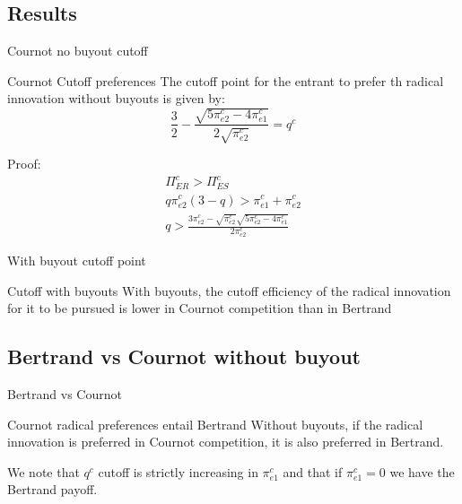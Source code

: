 \documentclass{beamer}
\numberwithin{equation}{section}
\begin{document}
\subsection{Results}
\begin{frame}{Cournot no buyout cutoff}
\begin{block}{Cournot Cutoff preferences}
The cutoff point for the entrant to prefer th radical innovation without buyouts is given by: 
\begin{equation*}
\frac{3}{2}-\frac{ \sqrt{5 \pi_{e2}^{c}-4 \pi_{e1}^{c}}}{2 \sqrt{\pi_{e2}^{c}}}=q^{c}
\end{equation*}
\end{block}
Proof:
\begin{align*}
\Pi_{ER}^{c}>\Pi_{ES}^{c} \\
q \pi_{e2}^{c} (3-q) > \pi_{e1}^{c}+\pi_{e2}^{c} \\
q> 
\frac{3 \pi_{e2}^{c}-\sqrt{\pi_{e2}^{c}} \sqrt{5 \pi_{e2}^{c}-4 \pi_{e1}^{c}}}{2 \pi_{e2}^{c}} 
\end{align*}
\end{frame}

\begin{frame}{With buyout cutoff point}
\begin{block}{Cutoff with buyouts}
With buyouts, the cutoff efficiency of the radical innovation for it to be pursued is lower in Cournot competition than in Bertrand
\end{block}
\end{frame}

\subsection{Bertrand vs Cournot without buyout}
\begin{frame}{Bertrand vs Cournot}
\begin{block}{Cournot radical preferences entail Bertrand}
Without buyouts, if the radical innovation is preferred in Cournot competition, it is also preferred in Bertrand. 
\end{block}
We note that $q^c$ cutoff is strictly increasing in $\pi_{e1}^{c}$ and that if $\pi_{e1}^{c}=0$ we have the Bertrand payoff.
\end{frame}
\end{document}
